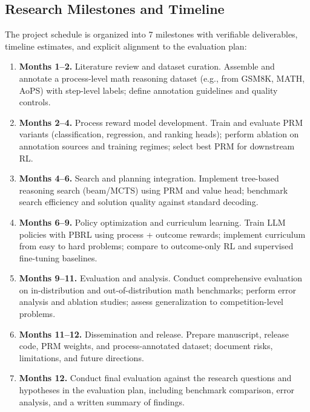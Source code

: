 \documentclass[11pt]{article}
\begin{document}
\subsection*{Research Milestones and Timeline}
\noindent The project schedule is organized into 7 milestones with verifiable deliverables, timeline estimates, and explicit alignment to the evaluation plan:\par\vspace{0.4em}
\begin{enumerate}[leftmargin=*,itemsep=0.35em,parsep=0pt,topsep=0.35em,partopsep=0pt]
  \item \textbf{Months 1--2.} Literature review and dataset curation. Assemble and annotate a process-level math reasoning dataset (e.g., from GSM8K, MATH, AoPS) with step-level labels; define annotation guidelines and quality controls.
  \item \textbf{Months 2--4.} Process reward model development. Train and evaluate PRM variants (classification, regression, and ranking heads); perform ablation on annotation sources and training regimes; select best PRM for downstream RL.
  \item \textbf{Months 4--6.} Search and planning integration. Implement tree-based reasoning search (beam/MCTS) using PRM and value head; benchmark search efficiency and solution quality against standard decoding.
  \item \textbf{Months 6--9.} Policy optimization and curriculum learning. Train LLM policies with PBRL using process + outcome rewards; implement curriculum from easy to hard problems; compare to outcome-only RL and supervised fine-tuning baselines.
  \item \textbf{Months 9--11.} Evaluation and analysis. Conduct comprehensive evaluation on in-distribution and out-of-distribution math benchmarks; perform error analysis and ablation studies; assess generalization to competition-level problems.
  \item \textbf{Months 11--12.} Dissemination and release. Prepare manuscript, release code, PRM weights, and process-annotated dataset; document risks, limitations, and future directions.
  \item \textbf{Months 12.} Conduct final evaluation against the research questions and hypotheses in the evaluation plan, including benchmark comparison, error analysis, and a written summary of findings.
\end{enumerate}
\end{document}
